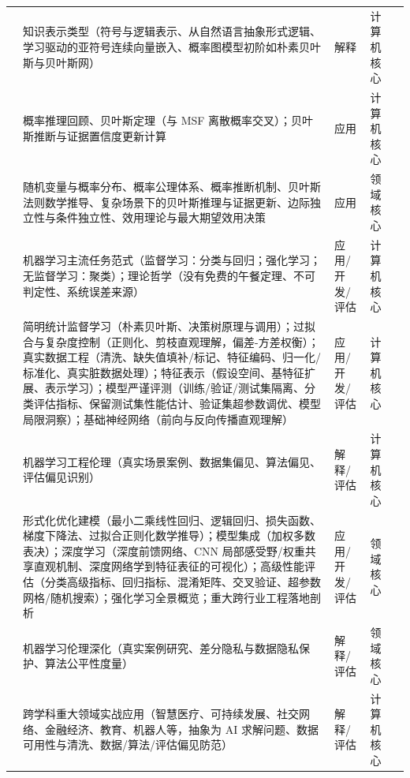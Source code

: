 \begin{tabularx}{\textwidth}{>{\raggedright\arraybackslash}p{} Y >{\centering\arraybackslash}p{0.15\textwidth} >{\centering\arraybackslash}p{0.09\textwidth} >{\centering\arraybackslash}p{0.06\textwidth}}
\midrule
{} 
& 知识表示类型（符号与逻辑表示、从自然语言抽象形式逻辑、学习驱动的亚符号连续向量嵌入、概率图模型初阶如朴素贝叶斯与贝叶斯网） & 解释 & 计算机核心 &  \\
& 概率推理回顾、贝叶斯定理（与 MSF 离散概率交叉）；贝叶斯推断与证据置信度更新计算 & 应用 & 计算机核心 & \\
& 随机变量与概率分布、概率公理体系、概率推断机制、贝叶斯法则数学推导、复杂场景下的贝叶斯推理与证据更新、边际独立性与条件独立性、效用理论与最大期望效用决策 & 应用 & 领域核心 & 2 \\
\midrule
{} 
& 机器学习主流任务范式（监督学习：分类与回归；强化学习；无监督学习：聚类）；理论哲学（没有免费的午餐定理、不可判定性、系统误差来源） & 应用/开发/评估 & 计算机核心 &  \\
& 简明统计监督学习（朴素贝叶斯、决策树原理与调用）；过拟合与复杂度控制（正则化、剪枝直观理解，偏差-方差权衡）；真实数据工程（清洗、缺失值填补/标记、特征编码、归一化/标准化、真实脏数据处理）；特征表示（假设空间、基特征扩展、表示学习）；模型严谨评测（训练/验证/测试集隔离、分类评估指标、保留测试集性能估计、验证集超参数调优、模型局限洞察）；基础神经网络（前向与反向传播直观理解） & 应用/开发/评估 & 计算机核心 & \\
& 机器学习工程伦理（真实场景案例、数据集偏见、算法偏见、评估偏见识别） & 解释/评估 & 计算机核心 & \\
& 形式化优化建模（最小二乘线性回归、逻辑回归、损失函数、梯度下降法、过拟合正则化数学推导）；模型集成（加权多数表决）；深度学习（深度前馈网络、CNN 局部感受野/权重共享直观机制、深度网络学到特征表征的可视化）；高级性能评估（分类高级指标、回归指标、混淆矩阵、交叉验证、超参数网格/随机搜索）；强化学习全景概览；重大跨行业工程落地剖析 & 应用/开发/评估 & 领域核心 &  \\
& 机器学习伦理深化（真实案例研究、差分隐私与数据隐私保护、算法公平性度量） & 解释/评估 & 领域核心 & \\
\midrule
{} 
& 跨学科重大领域实战应用（智慧医疗、可持续发展、社交网络、金融经济、教育、机器人等，抽象为 AI 求解问题、数据可用性与清洗、数据/算法/评估偏见防范） & 解释/评估 & 计算机核心 &  \\

\end{tabularx}
